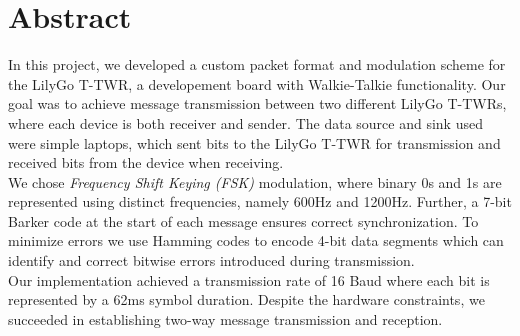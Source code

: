 \chapter{Abstract}
In this project, we developed a custom packet format and modulation scheme for the LilyGo T-TWR, a developement board with Walkie-Talkie functionality. Our goal was to achieve message transmission between two different LilyGo T-TWRs, where each device is both receiver and sender. The data source and sink used were simple laptops, which sent bits to the LilyGo T-TWR for transmission and received bits from the device when receiving. 
\\
We chose \textit{Frequency Shift Keying (FSK)} modulation, where binary 0s and 1s are represented using distinct frequencies, namely 600Hz and 1200Hz. Further, a 7-bit Barker code at the start of each message ensures correct synchronization. To minimize errors we use Hamming codes to encode 4-bit data segments which can identify and correct bitwise errors introduced during transmission. 
\\
Our implementation achieved a transmission rate of 16 Baud where each bit is represented by a 62ms symbol duration. Despite the hardware constraints, we succeeded in establishing two-way message transmission and reception.